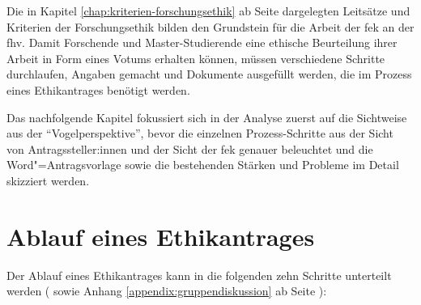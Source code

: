 \documentclass[a4paper,12pt,twoside]{scrreprt}
\begin{document}
Die in Kapitel \ref{chap:kriterien-forschungsethik} ab Seite \pageref{chap:kriterien-forschungsethik} dargelegten Leitsätze und Kriterien der Forschungsethik bilden den Grundstein für die Arbeit der \acl{fek} an der \acl{fhv}. Damit Forschende und Master-Studierende eine ethische Beurteilung ihrer Arbeit in Form eines Votums erhalten können, müssen verschiedene Schritte durchlaufen, Angaben gemacht und Dokumente ausgefüllt werden, die im Prozess eines Ethikantrages benötigt werden.

\medskip

Das nachfolgende Kapitel fokussiert sich in der Analyse zuerst auf die Sichtweise aus der \enquote{Vogelperspektive}, bevor die einzelnen Prozess-Schritte aus der Sicht von Antragssteller:innen und der Sicht der \ac{fek} genauer beleuchtet und die Word"=Antragsvorlage sowie die bestehenden Stärken und Probleme im Detail skizziert werden.

\section{Ablauf eines Ethikantrages}
\label{sec:ablauf-ethikantrag}

Der Ablauf eines Ethikantrages kann in die folgenden zehn Schritte unterteilt werden (\cite{fachhochschule_vorarlberg_gmbh_forschungsethik-kommission_2021, forschungsethik-kommission_der_fachhochschule_vorarlberg_verfahrensordnung_2020} sowie Anhang \ref{appendix:gruppendiskussion} ab Seite \pageref{appendix:gruppendiskussion}):
\end{document}
